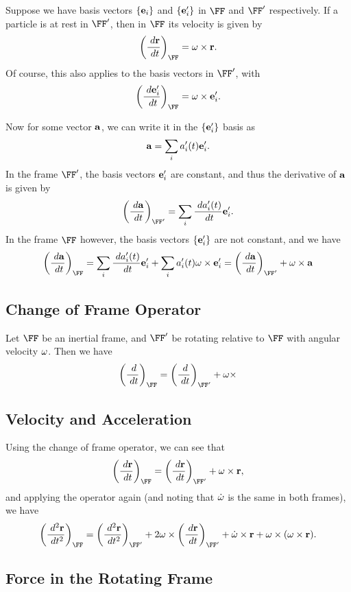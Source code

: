 \documentclass[a4paper]{scrartcl}
\begin{document}
Suppose we have basis vectors $\{\mathbf{e}_i\}$ and $\{\mathbf{e}_i'\}$ in $\FF$ and $\FF'$ respectively. If a particle is at rest in $\FF'$, then in $\FF$ its velocity is given by
	$$
	\left(\frac{\dd \vv r}{\dd t}\right)_{\FF} = \vv \omega \times \vv r.
	$$
	Of course, this also applies to the basis vectors in $\FF'$, with
	$$
	\left(\frac{\dd \vv e_i'}{\dd t}\right)_{\FF} =\vv \omega \times \vv e_i'.
	$$

	Now for some vector $\mathbf{a}$, we can write it in the $\{\mathbf{e}_i'\}$ basis as
	$$
\mathbf{a} = \sum_i a_i'(t) \mathbf{e}_i'.
$$
In the frame $\FF'$, the basis vectors $\mathbf{e}_i'$ are constant, and thus the derivative of $\mathbf{a}$ is given by
$$
\left(\frac{\dd \vv a}{\dd t}\right)_{\FF'} = \sum_i \frac{\dd a_i'(t)}{\dd t} \vv{e}_i'.
$$
In the frame $\FF$ however, the basis vectors $\{\mathbf{e}_i'\}$ are not constant, and we have
$$
\left(\frac{\dd \vv a}{\dd t}\right)_{\FF} = \sum_i \frac{\dd a_i'(t)}{\dd t} \vv{e}_i' + \sum_i a_i'(t) \vv \omega \times \vv e_i' = \left(\frac{\dd \vv a}{\dd t}\right)_{\FF'} +\vv \omega \times \vv a
$$

\subsection{Change of Frame Operator}

Let $\FF$ be an inertial frame, and $\FF'$ be rotating relative to $\FF$ with angular velocity $\mathbf{\omega}$.
Then we have
$$
\left(\frac{\dd}{\dd t}\right)_{\FF} = \left(\frac{\dd}{\dd t}\right)_{\FF'} +\vv \omega \times 
$$

\subsection{Velocity and Acceleration}

Using the change of frame operator, we can see that
$$
\left(\frac{\dd \vv r}{\dd t}\right)_{\FF} = \left(\frac{\dd \vv r}{\dd t}\right)_{\FF'} +\vv \omega \times \vv r,
$$
and applying the operator again (and noting that $\dot{\mathbf{\omega}}$ is the same in both frames), we have
$$
\left(\frac{\dd^2 \vv r}{\dd t^2}\right)_{\FF} = \left(\frac{\dd^2 \vv r}{\dd t^2}\right)_{\FF'} + 2 \vv \omega \times \left(\frac{\dd \vv r}{\dd t}\right)_{\FF'} + \dot{\vv \omega} \times \vv r + \vv \omega \times (\vv \omega \times \vv r).
$$

\subsection{Force in the Rotating Frame}
\end{document}
